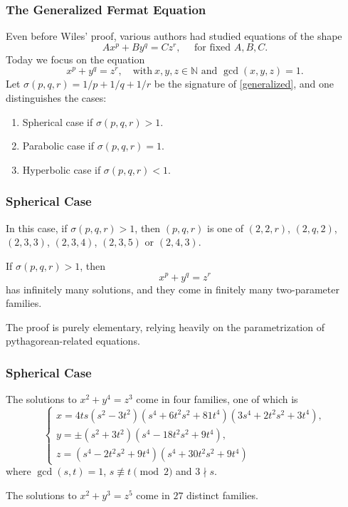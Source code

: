 \documentclass{beamer}
\newcommand{\NN}{\mathbb{N}}
\theoremstyle{plain}
\begin{document}
\begin{frame}
    \frametitle{The Generalized Fermat Equation}
    Even before Wiles' proof, various authors had studied equations of the shape
    $$Ax^p+By^q=Cz^r,\quad \text{ for fixed }A,B,C.$$
    Today we focus on the equation
    \begin{equation}\label{generalized}
        x^p+y^q=z^r, \quad\text{with}\ x,y,z\in\NN \text{ and } \gcd(x,y,z)=1.
    \end{equation}
    Let $\sigma(p,q,r)=1/p+1/q+1/r$ be the signature of \eqref{generalized}, and one distinguishes the cases:
    \begin{enumerate}
        \item Spherical case if $\sigma(p,q,r)>1$.
        \item Parabolic case if $\sigma(p,q,r)=1$.
        \item Hyperbolic case if $\sigma(p,q,r)<1$.
    \end{enumerate}
\end{frame}

\begin{frame}
    \frametitle{Spherical Case}
    In this case, if $\sigma(p,q,r)>1$, then $(p,q,r)$ is one of $(2,2,r)$, $(2,q,2)$, $(2,3,3)$, $(2,3,4)$, $(2,3,5)$ or $(2,4,3)$. 
    \begin{theorem}
        If $\sigma(p,q,r)>1$, then $$x^p+y^q=z^r$$ has infinitely many solutions, and they come in finitely many two-parameter families.
    \end{theorem}
    The proof is purely elementary, relying heavily on the parametrization of pythagorean-related equations.
    
\end{frame}

\begin{frame}
    \frametitle{Spherical Case}
    \begin{example}
        The solutions to $x^2+y^4=z^3$ come in four families, one of which is
        \[
        \begin{cases}
            x=4ts(s^2-3t^2)(s^4+6t^2s^2+81t^4)(3s^4+2t^2s^2+3t^4),\\
            y=\pm(s^2+3t^2)(s^4-18t^2s^2+9t^4),\\
            z=(s^4-2t^2s^2+9t^4)(s^4+30t^2s^2+9t^4)
        \end{cases}
        \]
        where $\gcd(s,t)=1$, $s\not\equiv t\pmod2$ and $3\nmid s$.
    \end{example}
    \begin{example}
        The solutions to $x^2+y^3=z^5$ come in $27$ distinct families. 
    \end{example}
\end{frame}
\end{document}
